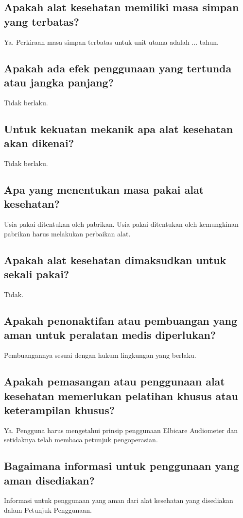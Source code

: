 \documentclass[11pt,a4paper,twoside,draft,onecolumn]{book}
\begin{document}
			\subsection{Apakah alat kesehatan memiliki masa simpan yang terbatas?}
			Ya. Perkiraan masa simpan terbatas untuk unit utama adalah ... tahun.
			
			\subsection{Apakah ada efek penggunaan yang tertunda atau jangka panjang?}
			Tidak berlaku.
			
			\subsection{Untuk kekuatan mekanik apa alat kesehatan akan dikenai?}
			Tidak berlaku.
			
			\subsection{Apa yang menentukan masa pakai alat kesehatan?}
			Usia pakai ditentukan oleh pabrikan. Usia pakai ditentukan oleh kemungkinan pabrikan harus melakukan perbaikan alat.
			
			\subsection{Apakah alat kesehatan dimaksudkan untuk sekali pakai?}
			Tidak.
			
			\subsection{Apakah penonaktifan atau pembuangan yang aman untuk peralatan medis diperlukan?}
			Pembuangannya sesuai dengan hukum lingkungan yang berlaku.
			
			\subsection{Apakah pemasangan atau penggunaan alat kesehatan memerlukan pelatihan khusus atau keterampilan khusus?}
			Ya. Pengguna harus mengetahui prinsip penggunaan Elbicare Audiometer dan setidaknya telah membaca petunjuk pengoperasian.
			
			\subsection{Bagaimana informasi untuk penggunaan yang aman disediakan?}
			Informasi untuk penggunaan yang aman dari alat kesehatan yang disediakan dalam Petunjuk Penggunaan.
			
\end{document}
